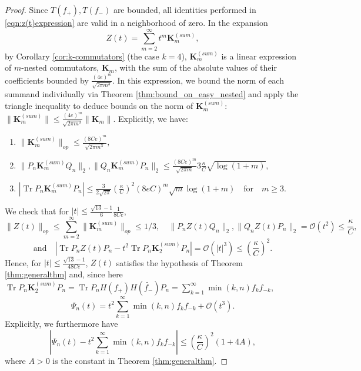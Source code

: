 \documentclass[11pt]{amsart}
\theoremstyle{plain}
\theoremstyle{remark}
\DeclareMathOperator{\Tr}{Tr}
\numberwithin{equation}{section}
\begin{document}
\begin{proof}
Since $T(f_+), T(f_-)$ are bounded, all identities performed in \eqref{eqn:z(t)expression} are valid in a neighborhood of zero. 
In the expansion
\begin{equation}\label{eqn:z(t)ksum}
Z(t)=\sum_{m=2}^{\infty}t^m\mathbf{K}_m^{(sum)},
\end{equation}
by Corollary \ref{cor:k-commutators} (the case $k=4$), $\mathbf{K}_m^{(sum)}$ is a linear expression of $m$-nested commutators, $\mathbf{K}_m$, with the sum of the absolute values of their coefficients bounded by $\frac{(4e)^m} 
{\sqrt{2\pi m^3}}$. In this expression, we bound the norm of each summand individually via Theorem \ref{thm:bound_on_easy_nested} and apply the triangle inequality to deduce bounds on the norm of $\mathbf{K}_m^{(sum)}$:
%
%
%
$\|\mathbf{K}_m^{(sum)}\|\leq \frac{(4e)^m}
{\sqrt{2\pi m^3}} \|\mathbf{K}_m\|$.
Explicitly, we have:
\begin{enumerate}
\item 
$
\|\mathbf{K}_m^{(sum)}\|_{op}\leq \frac{(8Ce)^m}{\sqrt{2\pi m^3}},
$
\item 
$
\|P_n\mathbf{K}_m^{(sum)}Q_n\|_{2}, \|Q_n\mathbf{K}_m^{(sum)}P_n\|_{2}\leq \frac{(8Ce)^m}{\sqrt{2\pi m}} 3\frac{\kappa}{C} \sqrt{\log(1+m)},$
\item 
$|\Tr  P_n \mathbf{K}_m^{(sum)} P_n| 
\leq \frac{3}{2\sqrt{2\pi}} 
\left(\frac{\kappa}{C}\right)^2 
(8eC)^m
\sqrt{m}
\log(1+m)
\quad\text{for}\quad m\geq 3.$
\end{enumerate}
We check that for $|t|\leq \frac{\sqrt{13}-1}{6}\frac{1}{8Ce}$,
$$\|Z(t)\|_{op}\leq\sum_{m=2}^{\infty}
\|\mathbf{K}_m^{(sum)}\|_{op}\leq 1/3,\quad \|P_nZ(t)Q_n\|_2 , \|Q_nZ(t)P_n\|_2=\mathcal{O}(t^2)\leq \frac{\kappa}{C},$$
$$\text{and}\quad\left|\Tr  P_nZ(t)P_n
- t^2\Tr  P_n\mathbf{K}_2^{(sum)}P_n\right|
=\mathcal{O}(|t|^3)
\leq \left(\frac{\kappa}{C}\right)^2.$$
Hence, for $|t|\leq \frac{\sqrt{13}-1}{48Ce}$,
$Z(t)$ satisfies the hypothesis of Theorem \ref{thm:generalthm} and, since here $\Tr P_n\mathbf{K}_2^{(sum)}P_n
=\Tr P_nH(f_+)H(\widetilde{f_-})P_n
=\sum_{k=1}^{\infty} 
\min(k,n)f_kf_{-k}
$,
\begin{equation}
\Psi_n(t)=t^2
\sum_{k=1}^{\infty} 
\min(k,n)f_kf_{-k}
+
\mathcal{O}(t^3).
\end{equation}
Explicitly, we furthermore have
$$
|
\Psi_n(t)-t^2
\sum_{k=1}^{\infty} 
\min(k,n)
f_kf_{-k} 
|
 \leq \left(\frac{\kappa}{C}\right)^2(1+4A),$$
where $A>0$ is the constant in Theorem \ref{thm:generalthm}.
\end{proof}
\end{document}
